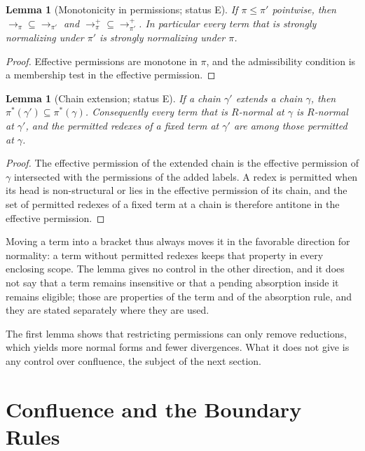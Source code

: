 \documentclass[11pt]{article}
\newtheorem{lemma}[theorem]{Lemma}
\theoremstyle{definition}
\theoremstyle{remark}
\newcommand{\Et}{status E}
\begin{document}
\begin{lemma}[Monotonicity in permissions; \Et]\label{lem:mono}
If $\pi\le\pi'$ pointwise, then $\to_\pi\subseteq\to_{\pi'}$ and $\to_\pi^{+}\subseteq\to_{\pi'}^{+}$. In particular every term that is strongly normalizing under $\pi'$ is strongly normalizing under $\pi$.
\end{lemma}

\begin{proof}
Effective permissions are monotone in $\pi$, and the admissibility condition is a membership test in the effective permission.
\end{proof}

\begin{lemma}[Chain extension; \Et]\label{lem:chain}
If a chain $\gamma'$ extends a chain $\gamma$, then $\pi^{*}(\gamma')\subseteq\pi^{*}(\gamma)$. Consequently every term that is $R$-normal at $\gamma$ is $R$-normal at $\gamma'$, and the permitted redexes of a fixed term at $\gamma'$ are among those permitted at $\gamma$.
\end{lemma}

\begin{proof}
The effective permission of the extended chain is the effective permission of $\gamma$ intersected with the permissions of the added labels. A redex is permitted when its head is non-structural or lies in the effective permission of its chain, and the set of permitted redexes of a fixed term at a chain is therefore antitone in the effective permission.
\end{proof}

Moving a term into a bracket thus always moves it in the favorable direction for normality: a term without permitted redexes keeps that property in every enclosing scope. The lemma gives no control in the other direction, and it does not say that a term remains insensitive or that a pending absorption inside it remains eligible; those are properties of the term and of the absorption rule, and they are stated separately where they are used.

The first lemma shows that restricting permissions can only remove reductions, which yields more normal forms and fewer divergences. What it does not give is any control over confluence, the subject of the next section.

\section{Confluence and the Boundary Rules}
\end{document}
